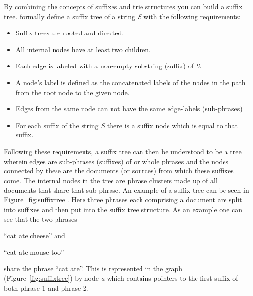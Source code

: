 By combining the concepts of suffixes and trie structures you can build a suffix tree. \cite{Oren1998} formally define a suffix tree of a string \textit{S} with the following requirements:
\begin{itemize}
\item Suffix trees are rooted and directed.
\item All internal nodes have at least two children.
\item Each edge is labeled with a non-empty substring (suffix) of \textit{S}.
\item A node's label is defined as the concatenated labels of the nodes in the path from the root node to the given node.
\item Edges from the same node can not have the same edge-labels (sub-phrases)
\item For each suffix of the string \textit{S} there is a suffix node which is equal to that suffix.
\end{itemize}

Following these requirements, a suffix tree can then be understood to be a tree wherein edges are sub-phrases (suffixes) of or whole phrases and the nodes connected by these are the documents (or sources) from which these suffixes come. The internal nodes in the tree are phrase clusters made up of all documents that share that sub-phrase. An example of a suffix tree can be seen in Figure~\ref{fig:suffixtree}. Here three phrases each comprising a document are split into suffixes and then put into the suffix tree structure. As an example one can see that the two phrases
\begin{inparaenum}[\itshape 1\upshape)]
\item ``cat ate cheese'' and
\item ``cat ate mouse too''
\end{inparaenum}
share the phrase ``cat ate''. This is represented in the graph (Figure~\ref{fig:suffixtree}) by node \textit{a} which contains pointers to the first suffix of both phrase 1 and phrase 2.

